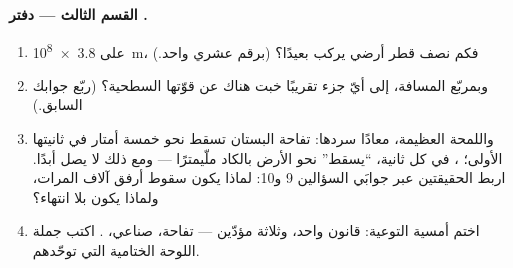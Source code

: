 \begin{problem}
\medskip\noindent\textbf{القسم الثالث --- دفتر .}
\begin{enumerate}[resume]
  \item {} على \qty{3.8e8}{m}، فكم نصف قطر أرضي يركب
        بعيدًا؟ (برقم عشري واحد.)
  \item وبمربّع المسافة، إلى أيّ جزء تقريبًا خبت 
        هناك عن قوّتها السطحية؟ (ربّع جوابك السابق.)
  \item واللمحة العظيمة، معادًا سردها: تفاحة البستان تسقط نحو
        خمسة أمتار في ثانيتها الأولى؛ ، في كل ثانية،
        ``يسقط'' نحو الأرض بالكاد ملّيمترًا --- ومع ذلك لا
        يصل أبدًا. اربط الحقيقتين عبر جوابَي السؤالين 9 و10:
        لماذا يكون سقوط  أرفق آلاف المرات، ولماذا يكون
        بلا انتهاء؟
  \item اختم أمسية التوعية: قانون واحد، وثلاثة مؤدّين ---
        تفاحة،  صناعي، . اكتب جملة اللوحة الختامية
        التي توحّدهم.
\end{enumerate}
\end{problem}

